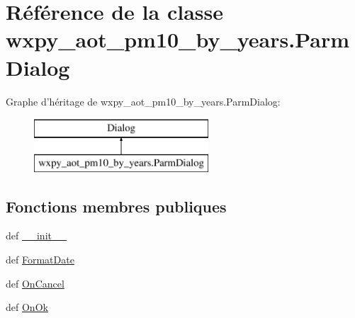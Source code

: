 \hypertarget{classwxpy__aot__pm10__by__years_1_1_parm_dialog}{\section{Référence de la classe wxpy\-\_\-aot\-\_\-pm10\-\_\-by\-\_\-years.\-Parm\-Dialog}
\label{classwxpy__aot__pm10__by__years_1_1_parm_dialog}
}
Graphe d'héritage de wxpy\-\_\-aot\-\_\-pm10\-\_\-by\-\_\-years.\-Parm\-Dialog\-:\begin{figure}[H]
\begin{center}
\leavevmode
\includegraphics[height=2.000000cm]{classwxpy__aot__pm10__by__years_1_1_parm_dialog}
\end{center}
\end{figure}
\subsection*{Fonctions membres publiques}
\begin{DoxyCompactItemize}
\item 
def \hyperlink{classwxpy__aot__pm10__by__years_1_1_parm_dialog_aaf8aad9aa96ec759ff1dbf2c4ac43063}{\-\_\-\-\_\-init\-\_\-\-\_\-}
\item 
def \hyperlink{classwxpy__aot__pm10__by__years_1_1_parm_dialog_a137d3b0e70159fe1f3d5e2682f9ffb65}{Format\-Date}
\item 
def \hyperlink{classwxpy__aot__pm10__by__years_1_1_parm_dialog_a81eb27d16e4b864d27f63754f0321658}{On\-Cancel}
\item 
def \hyperlink{classwxpy__aot__pm10__by__years_1_1_parm_dialog_a1d6fcb1a8cc75fd53d045d0352c17a28}{On\-Ok}
\end{DoxyCompactItemize}
